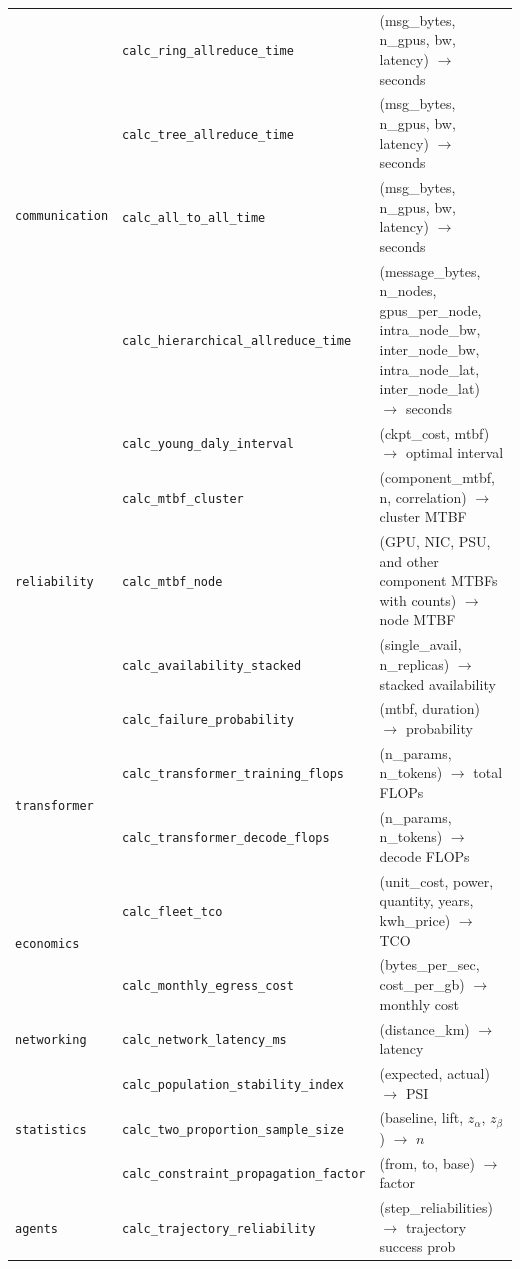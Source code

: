\documentclass[10pt,twocolumn]{article}
\begin{document}
\begin{appendices}
\begin{table}[!t]
\begin{tabularx}{\textwidth}{@{}l l X@{}}
\midrule
\multirow{4}{*}{\texttt{communication}} & \texttt{calc\_ring\_allreduce\_time} & (msg\_bytes, n\_gpus, bw, latency) $\to$ seconds \\
 & \texttt{calc\_tree\_allreduce\_time} & (msg\_bytes, n\_gpus, bw, latency) $\to$ seconds \\
 & \texttt{calc\_all\_to\_all\_time} & (msg\_bytes, n\_gpus, bw, latency) $\to$ seconds \\
 & \texttt{calc\_hierarchical\_allreduce\_time} & (message\_bytes, n\_nodes, gpus\_per\_node, intra\_node\_bw, inter\_node\_bw, intra\_node\_lat, inter\_node\_lat) $\to$ seconds \\
\midrule
\multirow{5}{*}{\texttt{reliability}} & \texttt{calc\_young\_daly\_interval} & (ckpt\_cost, mtbf) $\to$ optimal interval \\
 & \texttt{calc\_mtbf\_cluster} & (component\_mtbf, n, correlation) $\to$ cluster MTBF \\
 & \texttt{calc\_mtbf\_node} & (GPU, NIC, PSU, and other component MTBFs with counts) $\to$ node MTBF \\
 & \texttt{calc\_availability\_stacked} & (single\_avail, n\_replicas) $\to$ stacked availability \\
 & \texttt{calc\_failure\_probability} & (mtbf, duration) $\to$ probability \\
\midrule
\multirow{2}{*}{\texttt{transformer}} & \texttt{calc\_transformer\_training\_flops} & (n\_params, n\_tokens) $\to$ total FLOPs \\
 & \texttt{calc\_transformer\_decode\_flops} & (n\_params, n\_tokens) $\to$ decode FLOPs \\
\midrule
\multirow{2}{*}{\texttt{economics}} & \texttt{calc\_fleet\_tco} & (unit\_cost, power, quantity, years, kwh\_price) $\to$ TCO \\
 & \texttt{calc\_monthly\_egress\_cost} & (bytes\_per\_sec, cost\_per\_gb) $\to$ monthly cost \\
\midrule
\texttt{networking} & \texttt{calc\_network\_latency\_ms} & (distance\_km) $\to$ latency \\
\midrule
\multirow{3}{*}{\texttt{statistics}} & \texttt{calc\_population\_stability\_index} & (expected, actual) $\to$ PSI \\
 & \texttt{calc\_two\_proportion\_sample\_size} & (baseline, lift, $z_\alpha$, $z_\beta$) $\to$ $n$ \\
 & \texttt{calc\_constraint\_propagation\_factor} & (from, to, base) $\to$ factor \\
\midrule
\multirow{3}{*}{\texttt{agents}} & \texttt{calc\_trajectory\_reliability} & (step\_reliabilities) $\to$ trajectory success prob \\

\end{tabularx}
\end{table}
\end{appendices}
\end{document}
